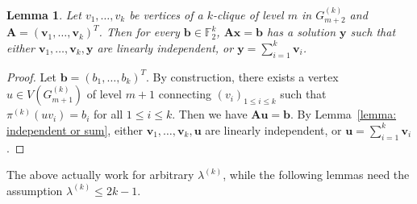 \documentclass[
final
]{dmtcs-episciences}
\newtheorem{lemma}[theorem]{Lemma}
\begin{document}
\begin{lemma}\label{lemma: sol independence or sum}
   Let $v_1, \ldots, v_k$ be vertices of
     a $k$-clique of level $m$ in $G^{(k)}_{m+2}$ and  $\mathbf{A} = {(\mathbf{v}_1, \ldots, \mathbf{v}_k)}^T$. Then for every $\mathbf{b} \in \mathbb{F}_2^k$, $\mathbf{Ax=b}$ has a solution $\mathbf{y}$ such that either $\mathbf{v}_1, \ldots, \mathbf{v}_k, \mathbf{y}$ are linearly independent, or $\mathbf{y} = \sum_{i=1}^{k} \mathbf{v}_i$.
\end{lemma}

\begin{proof} 
    Let $\mathbf{b}={(b_1,\ldots,b_k)}^T$. 
    By construction, there exists a vertex $u \in V(G^{(k)}_{m+1})$ of level $m+1$ connecting ${(v_i)}_{1 \le i \le k}$ such that $\pi^{(k)}(uv_i) = b_i$ for all $1 \le i \le k$. Then we have $\mathbf{Au=b}$.
    By Lemma~\ref{lemma: independent or sum}, either $\mathbf{v}_1, \ldots, \mathbf{v}_k, \mathbf{u}$ are linearly independent, or $\mathbf{u} = \sum_{i=1}^{k} \mathbf{v}_i$.
\end{proof}



The above actually work for arbitrary $\lambda^{(k)}$, while the following lemmas need the assumption $\lambda^{(k)} \le 2k-1$.
\end{document}
